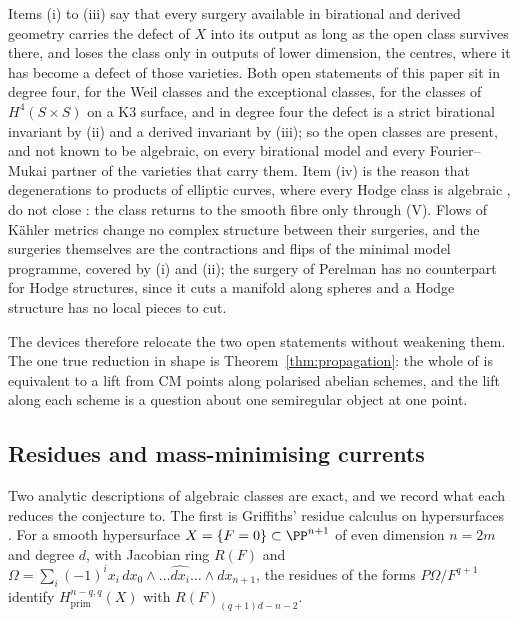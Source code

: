 Items (i) to (iii) say that every surgery available in birational and derived geometry carries the defect of $X$ into its output as long as the open class survives there, and loses the class only in outputs of lower dimension, the centres, where it has become a defect of those varieties. Both open statements of this paper sit in degree four, \Fii{} for the Weil classes and the exceptional classes, \Fiii{} for the classes of $H^{4}(S\times S)$ on a K3 surface, and in degree four the defect is a strict birational invariant by (ii) and a derived invariant by (iii); so the open classes are present, and not known to be algebraic, on every birational model and every Fourier--Mukai partner of the varieties that carry them. Item (iv) is the reason that degenerations to products of elliptic curves, where every Hodge class is algebraic \cite{MZ99}, do not close \Fii{}: the class returns to the smooth fibre only through (V). Flows of K\"ahler metrics change no complex structure between their surgeries, and the surgeries themselves are the contractions and flips of the minimal model programme, covered by (i) and (ii); the surgery of Perelman has no counterpart for Hodge structures, since it cuts a manifold along spheres and a Hodge structure has no local pieces to cut.

The devices therefore relocate the two open statements without weakening them. The one true reduction in shape is Theorem~\ref{thm:propagation}: the whole of \Fii{} is equivalent to a lift from CM points along polarised abelian schemes, and the lift along each scheme is a question about one semiregular object at one point.

\subsection{Residues and mass-minimising currents}\label{ssec:analytic}

Two analytic descriptions of algebraic classes are exact, and we record what each reduces the conjecture to. The first is Griffiths' residue calculus on hypersurfaces \cite{Gri69}. For a smooth hypersurface $X=\{F=0\}\subset\PP^{n+1}$ of even dimension $n=2m$ and degree $d$, with Jacobian ring $R(F)$ and $\Omega=\sum_{i}(-1)^{i}x_{i}\,dx_{0}\wedge\dots\widehat{dx_{i}}\dots\wedge dx_{n+1}$, the residues of the forms $P\Omega/F^{q+1}$ identify $H^{n-q,q}_{\mathrm{prim}}(X)$ with $R(F)_{(q+1)d-n-2}$.

